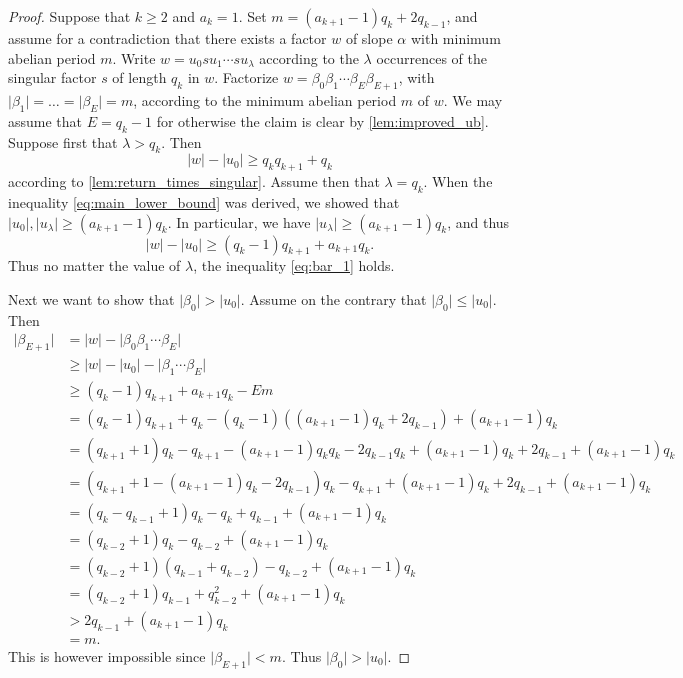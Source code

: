 \documentclass[a4paper,fleqn]{article}
\providecommand{\abs}[1]{\lvert#1\rvert}
\begin{document}
  \begin{proof}
    Suppose that $k \geq 2$ and $a_k = 1$. Set $m = (a_{k+1} - 1)q_k + 2q_{k-1}$, and assume for a contradiction that
    there exists a factor $w$ of slope $\alpha$ with minimum abelian period $m$. Write
    $w = u_0 s u_1 \cdots s u_\lambda$ according to the $\lambda$ occurrences of the singular factor $s$ of length
    $q_k$ in $w$. Factorize $w = \beta_0 \beta_1 \cdots \beta_E \beta_{E+1}$, with
    $\abs{\beta_1} = \ldots = \abs{\beta_E} = m$, according to the minimum abelian period $m$ of $w$. We may assume
    that $E = q_k - 1$ for otherwise the claim is clear by \autoref{lem:improved_ub}. Suppose first that
    $\lambda > q_k$. Then
    \begin{equation*}
      \abs{w} - \abs{u_0} \geq q_k q_{k+1} + q_k
    \end{equation*}
    according to \autoref{lem:return_times_singular}. Assume then that $\lambda = q_k$. When the inequality
    \eqref{eq:main_lower_bound} was derived, we showed that $\abs{u_0}, \abs{u_\lambda} \geq (a_{k+1} - 1)q_k$.
    In particular, we have $\abs{u_\lambda} \geq (a_{k+1} - 1)q_k$, and thus
    \begin{equation}\label{eq:bar_1}
      \abs{w} - \abs{u_0} \geq (q_k - 1)q_{k+1} + a_{k+1}q_k.
    \end{equation}
    Thus no matter the value of $\lambda$, the inequality \eqref{eq:bar_1} holds.

    Next we want to show that $\abs{\beta_0} > \abs{u_0}$. Assume on the contrary that $\abs{\beta_0} \leq \abs{u_0}$.
    Then
    \begin{align*}
      \abs{\beta_{E+1}} &= \abs{w} - \abs{\beta_0 \beta_1 \cdots \beta_E} \\
                        &\geq \abs{w} - \abs{u_0} - \abs{\beta_1 \cdots \beta_E} \\
                        &\geq (q_k - 1)q_{k+1} + a_{k+1}q_k - Em \\
                        &= (q_k - 1)q_{k+1} + q_k - (q_k - 1)((a_{k+1} - 1)q_k + 2q_{k-1}) + (a_{k+1} - 1)q_k \\
                        &= (q_{k+1} + 1)q_k - q_{k+1} - (a_{k+1} - 1)q_k q_k - 2q_{k-1}q_k + (a_{k+1} - 1)q_k + 2q_{k-1} + (a_{k+1} - 1)q_k \\
                        &= (q_{k+1} + 1 - (a_{k+1} - 1)q_k - 2q_{k-1})q_k - q_{k+1} + (a_{k+1} - 1)q_k + 2q_{k-1} + (a_{k+1} - 1)q_k \\
                        &= (q_k - q_{k-1} + 1)q_k - q_k + q_{k-1} + (a_{k+1} - 1)q_k \\
                        &= (q_{k-2} + 1)q_k - q_{k-2} + (a_{k+1} - 1)q_k \\
                        &= (q_{k-2} + 1)(q_{k-1} + q_{k-2}) - q_{k-2} + (a_{k+1} - 1)q_k \\
                        &= (q_{k-2} + 1)q_{k-1} + q_{k-2}^2 + (a_{k+1} - 1)q_k \\
                        &> 2q_{k-1} + (a_{k+1} - 1)q_k \\
                        &= m.
    \end{align*}
    This is however impossible since $\abs{\beta_{E+1}} < m$. Thus $\abs{\beta_0} > \abs{u_0}$.


\end{proof}
\end{document}
